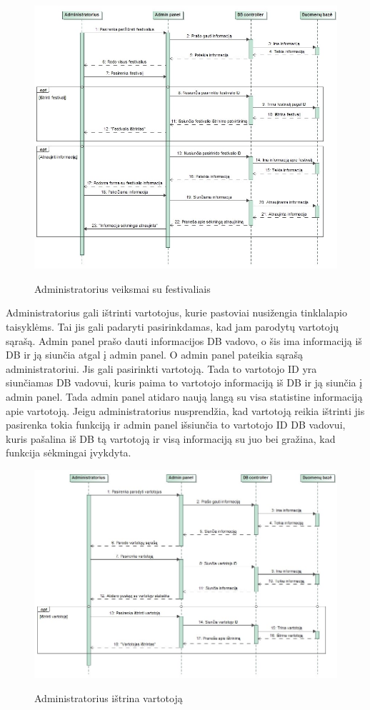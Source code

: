 ﻿\documentclass{VUMIFPSkursinis}
\begin{document}
\begin{figure}[H]
    \centering
    \includegraphics[scale=0.5]{img/Pav/AdminIstrintiAtnaujintiFest}
    \label{img:uml12}
	\caption{Administratorius veiksmai su festivaliais}
\end{figure}	
	
Administratorius gali ištrinti vartotojus, kurie pastoviai nusižengia tinklalapio taisyklėms. Tai jis gali padaryti pasirinkdamas, kad jam parodytų vartotojų sąrašą. Admin panel prašo dauti informacijos DB vadovo, o šis ima informaciją iš DB ir ją siunčia atgal į admin panel. O admin panel pateikia sąrašą administratoriui. Jis gali pasirinkti vartotoją. Tada to vartotojo ID yra siunčiamas DB vadovui, kuris paima to vartotojo informaciją iš DB ir ją siunčia į admin panel. Tada admin panel atidaro naują langą su visa statistine informaciją apie vartotoją. Jeigu administratorius nusprendžia, kad vartotoją reikia ištrinti jis pasirenka tokia funkciją ir admin panel išsiunčia to vartotojo ID DB vadovui, kuris pašalina iš DB tą vartotoją ir visą informaciją su juo bei gražina, kad funkcija sėkmingai įvykdyta.

\begin{figure}[H]
    \centering
    \includegraphics[scale=0.5]{img/Pav/AdminIstrintiVartotoja}
    \label{img:uml13}
	\caption{Administratorius ištrina vartotoją}
\end{figure}	
	
\end{document}

